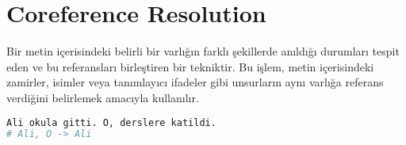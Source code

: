 \section{Coreference Resolution}

Bir metin içerisindeki belirli bir varlığın farklı şekillerde anıldığı durumları tespit eden ve bu referansları birleştiren bir tekniktir. Bu işlem, metin içerisindeki zamirler, isimler veya tanımlayıcı ifadeler gibi unsurların aynı varlığa referans verdiğini belirlemek amacıyla kullanılır.

\begin{lstlisting}[language=Python]
Ali okula gitti. O, derslere katildi.
# Ali, O -> Ali
\end{lstlisting}

\newpage